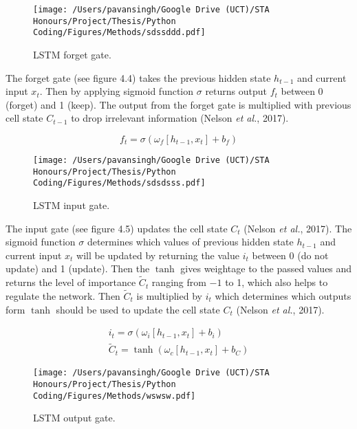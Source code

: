 \begin{figure}[h]
\centering
  \texttt{[image: /Users/pavansingh/Google Drive (UCT)/STA Honours/Project/Thesis/Python Coding/Figures/Methods/sdssddd.pdf]}
  \caption{LSTM forget gate.}
  \label{}
\end{figure}

The forget gate (see figure 4.4) takes the previous hidden state $h_{t-1}$ and current input $x_{t}$. Then by applying sigmoid function $\sigma$ returns output $f_{t}$ between 0 (forget) and 1 (keep). The output from the forget gate is multiplied with previous cell state $C_{t-1}$ to drop irrelevant information (Nelson \textit{et al.}, 2017).

\begin{equation}
f_{t}=\sigma\left(\omega_{f}\left[h_{t-1}, x_{t}\right]+b_{f}\right)
\end{equation}

\begin{figure}[h]
\centering
  \texttt{[image: /Users/pavansingh/Google Drive (UCT)/STA Honours/Project/Thesis/Python Coding/Figures/Methods/sdsdsss.pdf]}
  \caption{LSTM input gate.}
  \label{}
\end{figure}

The input gate (see figure 4.5) updates the cell state $C_{t}$ (Nelson \textit{et al.}, 2017). The sigmoid function $\sigma$ determines which values of previous hidden state $h_{t-1}$ and current input $x_{t}$ will be updated by returning the value $i_{t}$ between 0 (do not update) and 1 (update). Then the $\tanh$ gives weightage to the passed values and returns the level of importance $\tilde{C}_{t}$ ranging from $-1$ to 1, which also helps to regulate the network. Then $\tilde{C}_{t}$ is multiplied by $i_{t}$ which determines which outputs form $\tanh$ should be used to update the cell state $C_{t}$ (Nelson \textit{et al.}, 2017).

\begin{equation}
\begin{array}{l}
i_{t}=\sigma\left(\omega_{i}\left[h_{t-1}, x_{t}\right]+b_{i}\right) \\
\tilde{C}_{t}=\tanh \left(\omega_{c}\left[h_{t-1}, x_{t}\right]+b_{C}\right)
\end{array}
\end{equation}

\begin{figure}[h]
\centering
  \texttt{[image: /Users/pavansingh/Google Drive (UCT)/STA Honours/Project/Thesis/Python Coding/Figures/Methods/wswsw.pdf]}
  \caption{LSTM output gate.}
  \label{}
\end{figure}

